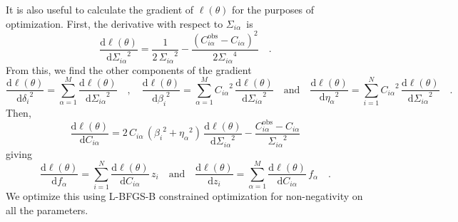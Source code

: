 \documentclass[12pt,preprint]{aastex}
\newcommand{\dd}{\mathrm{d}}
\newcommand{\nstars}{\ensuremath{M}}
\newcommand{\nobs}  {\ensuremath{N}}
\newcommand{\st}    {\ensuremath{\alpha}}
\newcommand{\obs}   {\ensuremath{i}}
\newcommand{\jabs}  {\ensuremath{\delta_\obs}}
\newcommand{\vs}    {\ensuremath{\eta_\st}}
\newcommand{\vo}    {\ensuremath{\beta_\obs}}
\newcommand{\sig}   {\ensuremath{\Sigma_{\obs\st}}}
\newcommand{\fstar} {\ensuremath{f_\st}}
\newcommand{\fobs}  {\ensuremath{z_\obs}}
\newcommand{\Cobs}  {\ensuremath{C_{\obs\st}^\mathrm{obs}}}
\newcommand{\Cmod}  {\ensuremath{C_{\obs\st}}}
\begin{document}
It is also useful to calculate the gradient of $\ell (\theta)$ for the
purposes of optimization. First, the derivative with respect to \sig\ is
\begin{equation}
    \frac{\dd \ell (\theta)}{\dd \sig^2} =
        \frac{1}{2\,\sig^2} - \frac{(\Cobs - \Cmod)^2}{2 \sig^4} \quad .
\end{equation}
From this, we find the other components of the gradient
\begin{equation}
    \frac{\dd \ell (\theta)}{\dd \jabs^2} = \sum_{\st=1}^\nstars
        \frac{\dd \ell (\theta)}{\dd \sig^2}
    \quad , \quad
    \frac{\dd \ell (\theta)}{\dd \vo^2} = \sum_{\st=1}^\nstars
        \Cmod^2 \, \frac{\dd \ell (\theta)}{\dd \sig^2}
    \quad \mathrm{and} \quad
    \frac{\dd \ell (\theta)}{\dd \vs^2} = \sum_{\obs=1}^\nobs
        \Cmod^2 \, \frac{\dd \ell (\theta)}{\dd \sig^2}
    \quad .
\end{equation}
Then,
\begin{equation}
    \frac{\dd \ell(\theta)}{\dd \Cmod} =
        2 \, \Cmod \, \left (\vo^2 + \vs^2\right ) \,
        \frac{\dd \ell (\theta)}{\dd \sig^2}
        - \frac{\Cobs - \Cmod}{\sig^2}
\end{equation}
giving
\begin{equation}
    \frac{\dd \ell (\theta)}{\dd \fstar} = \sum_{\obs=1}^\nobs
        \frac{\dd \ell(\theta)}{\dd \Cmod} \, \fobs
    \quad \mathrm{and} \quad
    \frac{\dd \ell (\theta)}{\dd \fobs} = \sum_{\st=1}^\nstars
        \frac{\dd \ell(\theta)}{\dd \Cmod} \, \fstar
    \quad .
\end{equation}
We optimize this using L-BFGS-B constrained optimization for non-negativity
on all the parameters.


\end{document}
